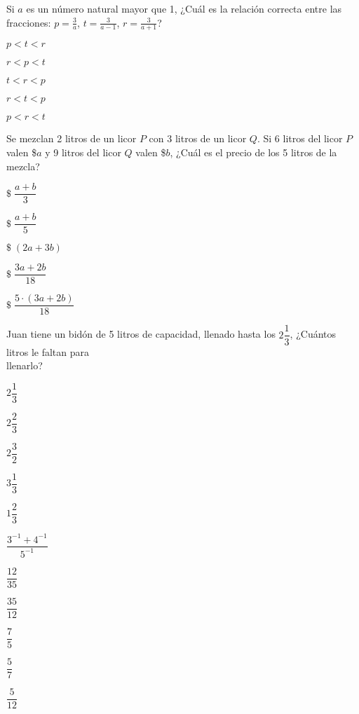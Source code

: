 \documentclass{caes}
\begin{document}
\pregunta Si $a$ es un número natural mayor que 1, ¿Cuál es la relación 
correcta entre las fracciones: $p = \frac{3}{a}$, $t = \frac{3}{a-1}$,
$r = \frac{3}{a+1}$?
\desarrollo[3cm]
\begin{alternativas*}
    \item $p < t < r$
    \item $r < p < t$
    \item $t < r < p$
    \item $r < t < p$
    \item $p < r < t$
\end{alternativas*} 

\pregunta Se mezclan 2 litros de un licor $P$ con 3 litros de un licor $Q$. Si
6 litros del licor $P$ valen \$$a$ y 9 litros del licor $Q$ valen \$$b$, 
¿Cuál es el precio de los 5 litros de la mezcla?
\desarrollo[3cm]
\begin{alternativas*}
    \item $\$\;\dfrac{a+b}{3}$
    \item $\$\;\dfrac{a+b}{5}$
    \item $\$\;(2a + 3b)$
    \item $\$\;\dfrac{3a+2b}{18}$
    \item $\$\;\dfrac{5\cdot(3a+2b)}{18}$
\end{alternativas*} 

\pregunta Juan tiene un bidón de 5 litros de capacidad, llenado hasta
los $2\dfrac{1}{3}$, ¿Cuántos litros le faltan para \\llenarlo?
\desarrollo[3cm]
\begin{alternativas*}
    \item $2\dfrac{1}{3}$
    \item $2\dfrac{2}{3}$
    \item $2\dfrac{3}{2}$
    \item $3\dfrac{1}{3}$
    \item $1\dfrac{2}{3}$
\end{alternativas*} 

\pregunta $\dfrac{3^{-1} + 4^{-1}}{5^{-1}}$
\desarrollo[3cm]
\begin{alternativas*}
    \item $\dfrac{12}{35}$
    \item $\dfrac{35}{12}$
    \item $\dfrac{7}{5}$
    \item $\dfrac{5}{7}$
    \item $\dfrac{5}{12}$
\end{alternativas*} 
\end{document}
